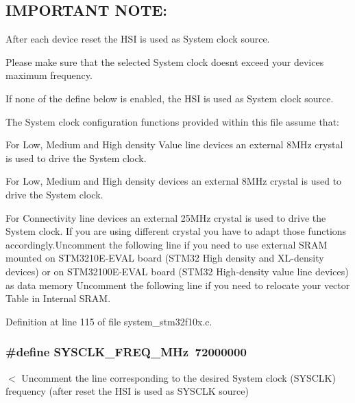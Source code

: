 \subsection*{I\+M\+P\+O\+R\+T\+A\+NT N\+O\+TE\+: }


\begin{DoxyEnumerate}
\item After each device reset the H\+SI is used as System clock source.
\item Please make sure that the selected System clock doesn\textquotesingle{}t exceed your device\textquotesingle{}s maximum frequency.
\item If none of the define below is enabled, the H\+SI is used as System clock source.
\item The System clock configuration functions provided within this file assume that\+:
\begin{DoxyItemize}
\item For Low, Medium and High density Value line devices an external 8\+M\+Hz crystal is used to drive the System clock.
\item For Low, Medium and High density devices an external 8\+M\+Hz crystal is used to drive the System clock.
\item For Connectivity line devices an external 25\+M\+Hz crystal is used to drive the System clock. If you are using different crystal you have to adapt those functions accordingly.\+Uncomment the following line if you need to use external S\+R\+AM mounted on S\+T\+M3210\+E-\/\+E\+V\+AL board (S\+T\+M32 High density and X\+L-\/density devices) or on S\+T\+M32100\+E-\/\+E\+V\+AL board (S\+T\+M32 High-\/density value line devices) as data memory Uncomment the following line if you need to relocate your vector Table in Internal S\+R\+AM. 
\end{DoxyItemize}
\end{DoxyEnumerate}

Definition at line 115 of file system\+\_\+stm32f10x.\+c.

\subsubsection[{\texorpdfstring{S\+Y\+S\+C\+L\+K\+\_\+\+F\+R\+E\+Q\+\_\+72\+M\+Hz}{SYSCLK_FREQ_72MHz}}]{\setlength{\rightskip}{0pt plus 5cm}\#define S\+Y\+S\+C\+L\+K\+\_\+\+F\+R\+E\+Q\+\_\+M\+Hz~72000000}\hypertarget{group___s_t_m32_f10x___system___private___defines_ga69649cc38f34627cfb48b51062ebd390}{}\label{group___s_t_m32_f10x___system___private___defines_ga69649cc38f34627cfb48b51062ebd390}
$<$ Uncomment the line corresponding to the desired System clock (S\+Y\+S\+C\+LK) frequency (after reset the H\+SI is used as S\+Y\+S\+C\+LK source)

